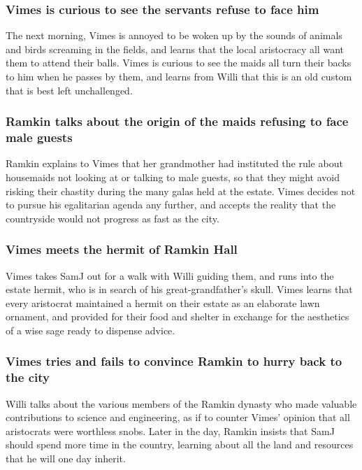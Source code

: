 \subsubsection{\Gls{Vimes} is curious to see the servants refuse to face him}
The next morning, \Gls{Vimes} is annoyed to be woken up by the sounds of animals and birds
screaming in the fields, and learns that the local aristocracy all want them to attend their balls.
\Gls{Vimes} is curious to see the maids all turn their backs to him when he passes by them, and
learns from \Gls{Willi} that this is an old custom that is best left unchallenged.

\subsubsection{\Gls{Ramkin} talks about the origin of the maids refusing to face male guests}
\Gls{Ramkin} explains to \Gls{Vimes} that her grandmother had instituted the rule about housemaids
not looking at or talking to male guests, so that they might avoid risking their chastity during
the many galas held at the estate. \Gls{Vimes} decides not to pursue his egalitarian agenda any
further, and accepts the reality that the countryside would not progress as fast as the city.

\subsubsection{\Gls{Vimes} meets the hermit of Ramkin Hall}
\Gls{Vimes} takes \Gls{SamJ} out for a walk with \Gls{Willi} guiding them, and runs into the
estate hermit, who is in search of his great-grandfather's skull. \Gls{Vimes} learns that every
aristocrat maintained a hermit on their estate as an elaborate lawn ornament, and provided for their
food and shelter in exchange for the aesthetics of a wise sage ready to dispense advice.

\subsubsection{\Gls{Vimes} tries and fails to convince \Gls{Ramkin} to hurry back to the city}
\Gls{Willi} talks about the various members of the Ramkin dynasty who made valuable contributions
to science and engineering, as if to counter \Gls{Vimes}' opinion that all aristocrats were
worthless snobs. Later in the day, \Gls{Ramkin} insists that \Gls{SamJ} should spend more time in
the country, learning about all the land and resources that he will one day inherit.

